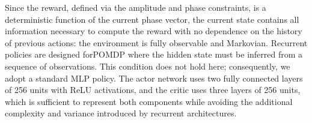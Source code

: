 Since the reward, defined via the amplitude and phase constraints, is a deterministic function of the current phase vector, the current state contains all information necessary to compute the reward with no dependence on the history of previous actions: the environment is fully observable and Markovian. Recurrent policies are designed for\gls{POMDP} \cite{kaelbling1998pomdp} where the hidden state must be inferred from a sequence of observations. This condition does not hold here; consequently, we adopt a standard MLP policy. The actor network uses two fully connected layers of 256 units with ReLU activations, and the critic uses three layers of 256 units, which is sufficient to represent both components while avoiding the additional complexity and variance introduced by recurrent architectures. 